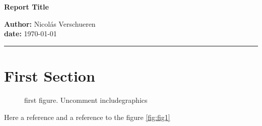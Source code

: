 \documentclass{article}
\begin{document}
\begin{center}
  \textbf{Report Title}
\end{center}
\begin{flushright}
  {\small \textbf{Author:} Nicol\'as Verschueren}\\
  {\small \textbf{date:} \today}
\end{flushright}
\hrule
\section{First Section}
\begin{figure}[H]
  \begin{center}
  \end{center}
    \caption{ first figure. Uncomment includegraphics}
  \end{figure}
  \label{fig:fig1}
  Here a reference \cite{refi} and a reference to the figure \ref{fig:fig1}
  

\end{document}
